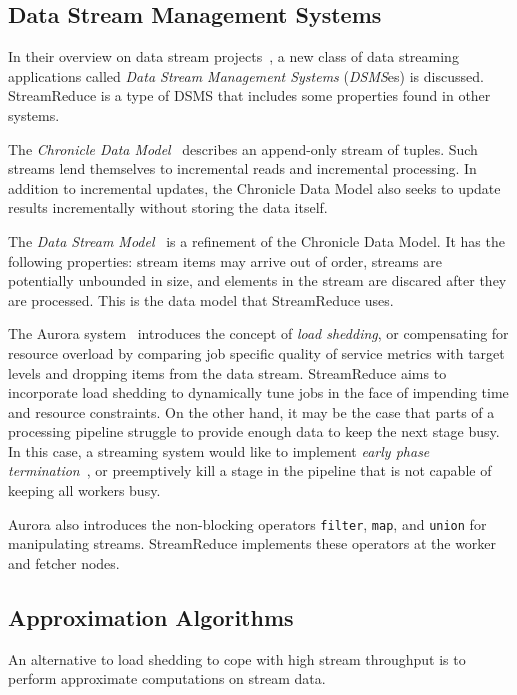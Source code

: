 \documentclass[12pt,twocolumn]{article}
\begin{document}
\subsection{Data Stream Management Systems}
In their overview on data stream projects~\cite{Babcock:2002:MID:543613.543615},
a new class of data streaming applications
called \emph{Data Stream Management Systems} (\emph{DSMS}es) is discussed.
StreamReduce is a type of DSMS that includes some properties found in other systems.

The \emph{Chronicle Data Model}~\cite{Jagadish:1995:VMI:212433.220201} describes an
append-only stream of tuples. Such
streams lend themselves to incremental reads and incremental processing. In addition to incremental
updates, the Chronicle Data Model also seeks to update results incrementally without storing the
data itself.

The \emph{Data Stream Model}~\cite{Babcock:2002:MID:543613.543615} is a refinement of the Chronicle
Data Model. It has the following properties: stream items may arrive out of order,
streams are potentially unbounded in size, and elements in the stream are discared after they are
processed. This is the data model that StreamReduce uses.

The Aurora system~\cite{Carney:2002:MSN:1287369.1287389} introduces the concept of
\emph{load shedding}, or compensating for
resource overload by comparing job specific quality of service metrics with target levels and
dropping items from the data stream.
StreamReduce aims to incorporate load shedding to dynamically tune jobs in the face of
impending time and resource constraints. On the other hand, it may be the case that
parts of a processing pipeline struggle to provide enough data to keep the next stage busy.
In this case, a streaming system would like to implement
\emph{early phase termination}~\cite{Rinard:2007:UEP:1297027.1297055}, or preemptively kill
a stage in the pipeline that is not capable of keeping all workers busy.

Aurora also introduces the non-blocking operators
\texttt{filter}, \texttt{map}, and \texttt{union} for
manipulating streams. StreamReduce implements these operators at the worker and fetcher nodes.

\subsection{Approximation Algorithms}
An alternative to load shedding to cope with high stream throughput is to perform approximate
computations on stream data.
\end{document}
